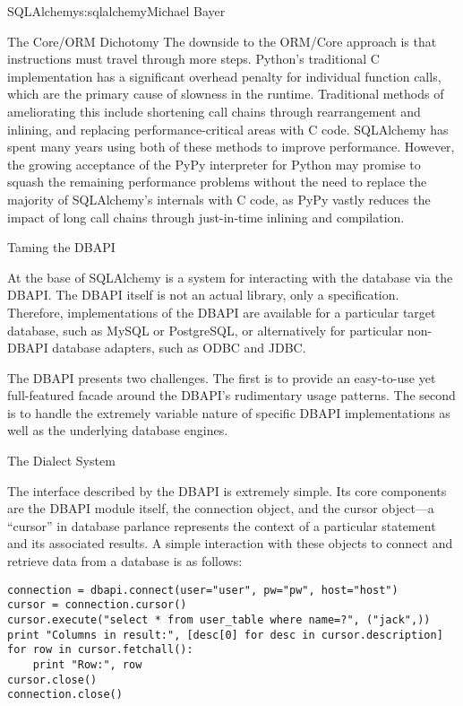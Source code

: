 \begin{aosachapter}{SQLAlchemy}{s:sqlalchemy}{Michael Bayer}
\begin{aosasect1}{The Core/ORM Dichotomy}
The downside to the ORM/Core approach is that instructions must
travel through more steps.  Python's
traditional C implementation has a significant overhead penalty
for individual function calls, which are the primary cause
of slowness in the runtime.  Traditional methods of ameliorating
this include shortening call chains through rearrangement
and inlining, and replacing performance-critical areas with C code.
SQLAlchemy has spent many years using both of these methods to
improve performance.   However, the growing acceptance of the
PyPy interpreter for Python may promise to squash the remaining
performance problems without the need to replace the majority of
SQLAlchemy's internals with C code, as PyPy vastly
reduces the impact of long call chains through just-in-time
inlining and compilation.

\end{aosasect1}

\begin{aosasect1}{Taming the DBAPI}

At the base of SQLAlchemy is a system for interacting with the database via
the DBAPI.  The DBAPI itself is not an actual library, only
a specification. Therefore, implementations of the DBAPI are available for a
particular target database, such as MySQL or PostgreSQL, or alternatively
for particular non-DBAPI database adapters, such as ODBC and JDBC.

The DBAPI presents two challenges.  The first is to provide an
easy-to-use yet full-featured facade around the DBAPI's rudimentary
usage patterns.  The second is to handle the extremely variable nature of
specific DBAPI implementations as well as the underlying database engines.

\begin{aosasect2}{The Dialect System}

The interface described by the DBAPI is extremely simple. Its core components
are the DBAPI module itself, the connection object, and the cursor
object---a ``cursor'' in database parlance represents the context of a
particular statement and its associated results.  A simple interaction with these
objects to connect and retrieve data from a database is as follows:

\begin{verbatim}
connection = dbapi.connect(user="user", pw="pw", host="host")
cursor = connection.cursor()
cursor.execute("select * from user_table where name=?", ("jack",))
print "Columns in result:", [desc[0] for desc in cursor.description]
for row in cursor.fetchall():
    print "Row:", row
cursor.close()
connection.close()
\end{verbatim}


\end{aosasect2}
\end{aosasect1}
\end{aosachapter}
